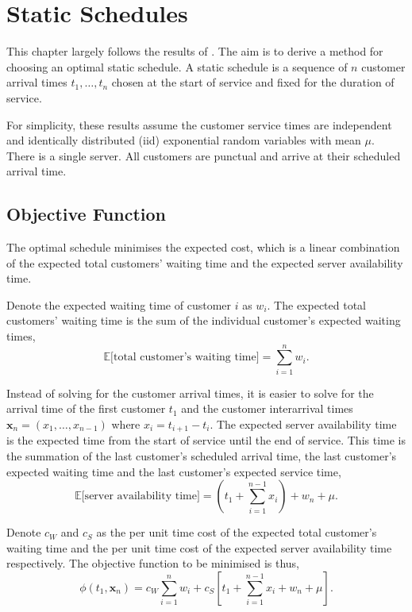 \chapter{Static Schedules}
\label{chap:Static}
This chapter largely follows the results of \citet{Pegden}. The aim is to derive a method for choosing an optimal static schedule. A static schedule is a sequence of $n$ customer arrival times $t_{1}, \ldots, t_{n}$ chosen at the start of service and fixed for the duration of service. 

For simplicity, these results assume the customer service times are independent and identically distributed (iid) exponential random variables with mean $\mu$. There is a single server. All customers are punctual and arrive at their scheduled arrival time.

\section{Objective Function}
The optimal schedule minimises the expected cost, which is a linear combination of the expected total customers' waiting time and the expected server availability time.

Denote the expected waiting time of customer $i$ as $w_{i}$. The expected total customers' waiting time is the sum of the individual customer's expected waiting times,
\begin{equation}
	\mathbb{E} \Big[\text{total customer's waiting time} \Big] = \sum_{i = 1}^{n} w_{i}.
\end{equation}

Instead of solving for the customer arrival times, it is easier to solve for the arrival time of the first customer $t_{1}$ and the customer interarrival times $\mathbf{x}_{n} = (x_{1}, \ldots, x_{n - 1})$ where $x_{i} = t_{i + 1} - t_{i}$. The expected server availability time is the expected time from the start of service until the end of service. This time is the summation of the last customer's scheduled arrival time, the last customer's expected waiting time and the last customer's expected service time,
\begin{equation}
	\mathbb{E} \Big[\text{server availability time} \Big] = \left( t_{1} + \sum_{i = 1}^{n - 1} x_{i} \right) + w_{n} + \mu.
\end{equation}

Denote $c_{W}$ and $c_{S}$ as the per unit time cost of the expected total customer's waiting time and the per unit time cost of the expected server availability time respectively. The objective function to be minimised is thus,
\begin{equation}
	\phi (t_{1}, \mathbf{x}_{n}) = c_{W} \sum_{i = 1}^{n} w_{i} + c_{S} \left[ t_{1} + \sum_{i = 1}^{n - 1} x_{i} + w_{n} + \mu \right].
\end{equation}

